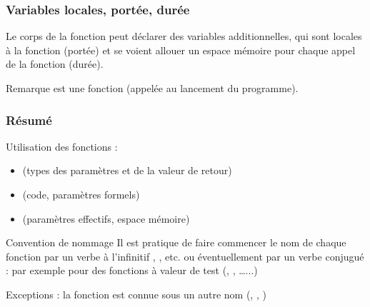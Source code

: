 \documentclass[xcolor=pdftex,svgnames,table]{beamer}
\begin{document}
\begin{frame}
    \frametitle{Variables locales, portée, durée}

    Le corps de la fonction peut déclarer des variables additionnelles,
    qui sont locales à la fonction (portée) et se voient allouer un
    espace mémoire pour chaque appel de la fonction (durée).

    \begin{block}{Remarque}  est une fonction (appelée au lancement du
      programme).
    \end{block}
\end{frame}


\begin{frame}
  \frametitle{Résumé}
 Utilisation des fonctions :
  \begin{itemize}
    \item {} (types des paramètres et de la valeur de retour)
    \item {}  (code, paramètres formels)
    \item {} (paramètres effectifs, espace mémoire)
  \end{itemize}
\pause
\begin{block}{Convention de nommage} 
  Il est pratique de faire commencer le nom de chaque fonction par un
  verbe à l'infinitif , ,
  etc. ou éventuellement par un verbe conjugué : par exemple 
  pour des fonctions à valeur de test (,
  , \ldots...)

Exceptions : la fonction est connue sous un autre nom
  (, , ) 
\end{block}
\end{frame}
\end{document}
